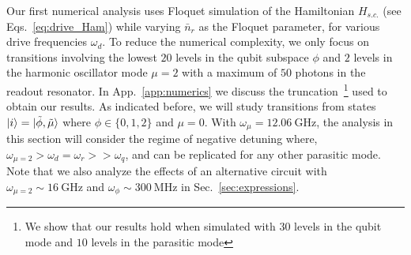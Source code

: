 \documentclass[%
reprint,
superscriptaddress,
 amsmath,amssymb,
 aps,
 prx,
longbibliography,
floatfix,
]{revtex4-2}
\newcommand{\sh}[1]{{\color{orange}{{}[SS: #1]}}}%
\begin{document}
Our first numerical analysis uses Floquet simulation of the Hamiltonian $H_{s.c.}$ (see Eqs.~\ref{eq:drive_Ham}) while varying $\bar n_r$ as the Floquet parameter, for various drive frequencies $\omega_d$. To reduce the numerical complexity, we only focus on transitions involving the lowest $20$ levels in the qubit subspace $\phi$ and $2$ levels in the harmonic oscillator mode $\mu=2$ with a maximum of $50$ photons in the readout resonator. In App.~\ref{app:numerics} we discuss the truncation~\footnote{We show that our results hold when simulated with $30$ levels in the qubit mode and $10$ levels in the parasitic mode} used to obtain our results. %
As indicated before, we will study transitions from states $\ket{i} =\ket{\tilde{\phi}, \tilde{\mu}}$ where $\phi\in\{0,1,2\}$ and $\mu=0$. With $\omega_\mu=12.06 \ \mathrm{GHz}$, the analysis in this section will consider the regime of negative detuning where, $\omega_{\mu=2}>\omega_d=\omega_r>>\omega_q$, and can be replicated for any other parasitic mode. Note that we also analyze the effects of an alternative circuit with $\omega_{\mu=2}\sim 16 \ \mathrm{GHz}$ and $\omega_\phi\sim 300 \ \mathrm{MHz}$ in Sec.~\ref{sec:expressions}.
\end{document}
